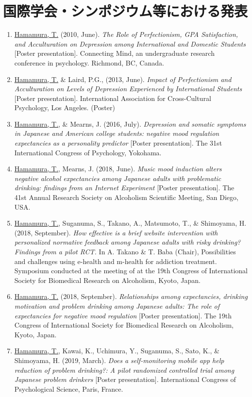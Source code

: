 \documentclass[11pt,a4paper]{article}
\begin{document}
\section{国際学会・シンポジウム等における発表}
\begin{enumerate}
	\item \underline{Hamamura, T.} (2010, June). \textit{The Role of Perfectionism, GPA Satisfaction, and Acculturation on Depression among International and Domestic Students} [Poster presentation]. Connecting Mind, an undergraduate research conference in psychology. Richmond, BC, Canada.
	\item \underline{Hamamura, T.} \& Laird, P.G., (2013, June). \textit{Impact of Perfectionism and Acculturation on Levels of Depression Experienced by International Students} [Poster presentation]. International Association for Cross-Cultural Psychology, Los Angeles. (Poster)
	\item \underline{Hamamura, T.}, \& Mearns, J. (2016, July). \textit{Depression and somatic symptoms in Japanese and American college students: negative mood regulation expectancies as a personality predictor} [Poster presentation]. The 31st International Congress of Psychology, Yokohama.
	\item \underline{Hamamura, T.}, Mearns, J. (2018, June). \textit{Music mood induction alters negative alcohol expectancies among Japanese adults with problematic drinking: findings from an Internet Experiment} [Poster presentation]. The 41st Annual Research Society on Alcoholism Scientific Meeting, San Diego, USA.
	\item \underline{Hamamura, T.}, Suganuma, S., Takano, A., Matsumoto, T., \& Shimoyama, H. (2018, September). \textit{How effective is a brief website intervention with personalized normative feedback among Japanese adults with risky drinking? Findings from a pilot RCT.} In A. Takano \& T. Baba (Chair), Possibilities and challenges using e-health and m-health for addiction treatment. Symposium conducted at the meeting of at the 19th Congress of International Society for Biomedical Research on Alcoholism, Kyoto, Japan.
	\item \underline{Hamamura, T.} (2018, September). \textit{Relationships among expectancies, drinking motivation and problem drinking among Japanese adults: The role of expectancies for negative mood regulation} [Poster presentation]. The 19th Congress of International Society for Biomedical Research on Alcoholism, Kyoto, Japan.
	\item \underline{Hamamura, T.}, Kawai, K., Uchimura, Y., Suganuma, S., Sato, K., \& Shimoyama, H. (2019, March). \textit{Does a self-monitoring mobile app help reduction of problem drinking?: A pilot randomized controlled trial among Japanese problem drinkers} [Poster presentation]. International Congress of Psychological Science, Paris, France.

\end{enumerate}
\end{document}
